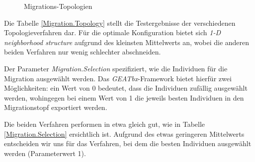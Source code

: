 \begin{figure}[!h] \centering
    \hfill
    \caption{Migrations-Topologien \cite{geatbx-ea}}
    \label{fig.migrationtopology}
\end{figure}



\noindent Die Tabelle \ref{Migration.Topology} stellt die Testergebnisse der
verschiedenen Topologieverfahren dar. Für die optimale Konfiguration bietet sich
\emph{1-D neighborhood structure} aufgrund des kleinsten Mittelwerts an, wobei
die anderen beiden Verfahren nur wenig schlechter abschneiden.


Der Parameter \emph{Migration.Selection} spezifiziert, wie die Individuen für
die Migration ausgewählt werden. Das \emph{GEATbx}-Framework bietet hierfür zwei
Möglichkeiten: ein Wert von 0 bedeutet, dass die Individuen zufällig ausgewählt
werden, wohingegen bei einem Wert von 1 die jeweils besten Individuen in den
Migrationstopf exportiert werden.



\noindent Die beiden Verfahren performen in etwa gleich gut, wie in Tabelle
\ref{Migration.Selection} ersichtlich ist. Aufgrund des etwas geringeren
Mittelwerts entscheiden wir uns für das Verfahren, bei dem die besten Individuen
ausgewählt werden (Parameterwert 1).

